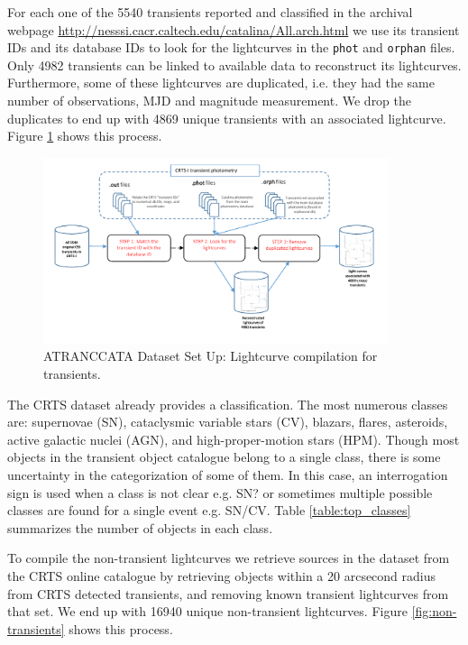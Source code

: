 \documentclass[a4paper,fleqn,usenatbib]{mnras}
\begin{document}
For each one of the 5540 transients reported and classified in the
archival webpage \url{http://nesssi.cacr.caltech.edu/catalina/All.arch.html} we use its
transient IDs and its database IDs to look for the lightcurves in the
\texttt{phot} and \texttt{orphan} files. 
Only 4982 transients can be linked to available data to reconstruct
its lightcurves. 
Furthermore, some of these lightcurves are duplicated, i.e. they had
the same number of observations, MJD and magnitude measurement. 
We drop the duplicates to end up with 4869 unique transients with an
associated lightcurve. Figure \ref{fig:transients} shows this process. 

\begin{figure}
	\includegraphics[width=0.9\textwidth]{Transients.pdf}
  \caption{ATRANCCATA Dataset Set Up: Lightcurve compilation for transients.}
  \label{fig:transients}
\end{figure} 

The CRTS dataset already provides a classification. 
The most numerous classes are: supernovae (SN),
cataclysmic variable stars (CV), blazars, flares, asteroids, active
galactic nuclei (AGN), and high-proper-motion stars (HPM). 
Though most objects in the transient object catalogue belong to a single class,
there is some uncertainty in the categorization of some of
them. 
In this case, an interrogation sign is used when a class is not clear
e.g. SN? or sometimes multiple possible classes are found for a single
event e.g. SN/CV.
Table \ref{table:top_classes} summarizes the number of objects in
each class. 

To compile the non-transient lightcurves we retrieve sources in the
dataset from the CRTS online catalogue by retrieving objects within a
20 arcsecond radius from CRTS detected transients, 
and removing known transient lightcurves from that set. 
We end up with 16940 unique non-transient lightcurves. Figure \ref{fig:non-transients} shows this process. 
\end{document}
